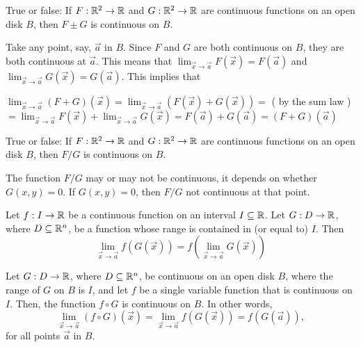 \documentclass{ximera}
\begin{document}
\begin{question}
  True or false: If $F:\mathbb R^2\to\mathbb R$ and $G:\mathbb R^2\to\mathbb R$ are continuous
  functions on an open disk $B$, then $F\pm G$ is continuous on $B$.
  \begin{prompt}
    \begin{multipleChoice}
  \end{multipleChoice}
  \end{prompt}
\end{question}
\begin{explanation}
Take any point, say, $\vec{a}$ in $B$. Since $F$ and $G$ are both continuous on $B$, they are both continuous at $\vec{a}$.
This means that $\lim_{\vec{x}\to\vec{a}} F(\vec{x}) = F(\vec{a})$ and $\lim_{\vec{x}\to\vec{a}} G(\vec{x}) = G(\vec{a})$.
This implies that

 $\lim_{\vec{x}\to\vec{a}} (F+G)(\vec{x})=\lim_{\vec{x}\to\vec{a}} (F(\vec{x})+G(\vec{x}))= $ (\textrm{  by the sum law })\\
 $=\lim_{\vec{x}\to\vec{a}} F(\vec{x})+\lim_{\vec{x}\to\vec{a}} G(\vec{x})= F(\vec{a})+G(\vec{a})=(F+G)(\vec{a})$ 


\end{explanation}
\begin{question}
  True or false: If $F:\mathbb R^2\to\mathbb R$ and $G:\mathbb R^2\to\mathbb R$ are continuous
  functions on an open disk $B$, then $F/G$ is continuous on $B$.
  \begin{prompt}
    \begin{multipleChoice}
    \end{multipleChoice}
    \begin{feedback}
      The function $F/G$ may or may not be continuous, it depends on
      whether $G(x,y)=0$. If $G(x,y)=0$, then $F/G$ not continuous at that point.
    \end{feedback}
  \end{prompt}
\end{question}


\begin{theorem}
  Let $f:I\to\mathbb R$ be a continuous function on an interval $I\subseteq\mathbb R$. Let
  $G:D\to \mathbb R$, where $D\subseteq\mathbb R^n$,  be a function whose range is contained in (or equal
  to) $I$. Then
  \[
  \lim_{\vec{x}\to\vec{a}} f( G(\vec{x})) = f(\lim_{\vec{x}\to\vec{a}}G(\vec{x}))
  \]
\end{theorem}


\begin{corollary}
  Let $G:D\to \mathbb R$, where $D\subseteq\mathbb R^n$, be continuous on an open disk $B$, where the
  range of $G$ on $B$ is $I$, and let $f$ be a single variable
  function that is continuous on $I$. Then, the function $f\circ G$ is continuous on $B$.
  In other words,
  \[
 \lim_{\vec{x}\to\vec{a}} (f\circ G)(\vec{x}) =\lim_{\vec{x}\to\vec{a}}f(G(\vec{x}))=f(G(\vec{a})),
  \]
  for all points $\vec{a}$ in $B$.
\end{corollary}
\end{document}
